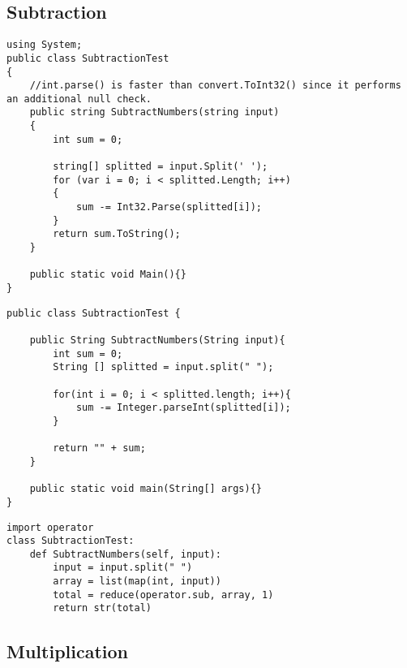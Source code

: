 \subsection{Subtraction}


	\lstset{style=sharpc}
	\begin{lstlisting}
using System;
public class SubtractionTest
{
    //int.parse() is faster than convert.ToInt32() since it performs an additional null check.
    public string SubtractNumbers(string input)
    {
        int sum = 0;

        string[] splitted = input.Split(' ');
        for (var i = 0; i < splitted.Length; i++)
        {
            sum -= Int32.Parse(splitted[i]);
        }
        return sum.ToString();
    }

	public static void Main(){}
}
	\end{lstlisting}

	\lstset{style=java}
	\begin{lstlisting}
public class SubtractionTest {

	public String SubtractNumbers(String input){
		int sum = 0;
		String [] splitted = input.split(" ");

		for(int i = 0; i < splitted.length; i++){
			sum -= Integer.parseInt(splitted[i]);
		}

		return "" + sum;
	}

	public static void main(String[] args){}
}
	\end{lstlisting}


	\lstset{style=python}
	\begin{lstlisting}
import operator
class SubtractionTest:
    def SubtractNumbers(self, input):
        input = input.split(" ")
        array = list(map(int, input))
        total = reduce(operator.sub, array, 1)
        return str(total)
	\end{lstlisting}


\subsection{Multiplication}


